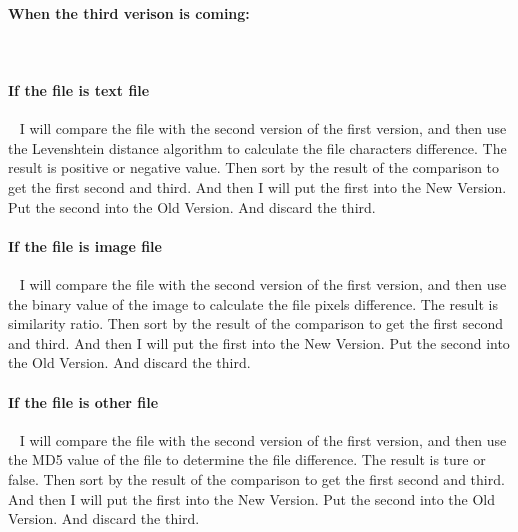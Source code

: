 \documentclass[12pt,a4]{article}
\begin{document}
\paragraph{When the third verison is coming:}~{}
\paragraph{If the file is text file}~{}
\newline
I will compare the file with the second version of the first version, and then use the Levenshtein distance algorithm to calculate the file characters difference. The result is positive or negative value.
Then sort by the result of the comparison to get the first second and third. And then I will put the first into the New Version. Put the second into the Old Version. And discard the third.
\paragraph{If the file is image file}~{}
\newline
I will compare the file with the second version of the first version, and then use the binary value of the image to calculate the file pixels difference. The result is similarity ratio.
Then sort by the result of the comparison to get the first second and third. And then I will put the first into the New Version. Put the second into the Old Version. And discard the third.
\paragraph{If the file is other file}~{}
\newline
I will compare the file with the second version of the first version, and then use the MD5 value of the file to determine the file difference. The result is ture or false.
Then sort by the result of the comparison to get the first second and third. And then I will put the first into the New Version. Put the second into the Old Version. And discard the third.
\end{document}
